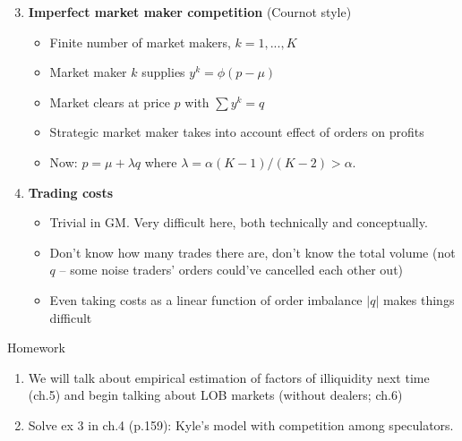 \documentclass[english,10pt
,aspectratio=169
]{beamer}
\begin{document}
\begin{frame}{}
	\begin{enumerate}
		\setcounter{enumi}{2}
		\item \textbf{Imperfect market maker competition} (Cournot style)
		\begin{itemize}
			\item Finite number of market makers, $k=1,..., K$
			\item Market maker $k$ supplies $y^k=\phi(p-\mu)$
			\item Market clears at price $p$ with $\sum y^k = q$
			\item Strategic market maker takes into account effect of orders on profits
			\item Now: $p=\mu+\lambda q$ where $\lambda = \alpha (K-1)/(K-2) > \alpha$. 
		\end{itemize}
		\pause
		\item \textbf{Trading costs}
		\begin{itemize}
			\item Trivial in GM. Very difficult here, both technically and conceptually.
			\item Don't know how many trades there are, don't know the total volume (not $q$ -- some noise traders' orders could've cancelled each other out)
			\item Even taking costs as a linear function of order imbalance $|q|$ makes things difficult
		\end{itemize}
	\end{enumerate}
\end{frame}


\begin{frame}{Homework}
	\begin{enumerate}
		\item We will talk about empirical estimation of factors of illiquidity next time (ch.5) and begin talking about LOB markets (without dealers; ch.6)
		\item Solve ex 3 in ch.4 (p.159): Kyle's model with competition among speculators.
	\end{enumerate}
\end{frame}
\end{document}
